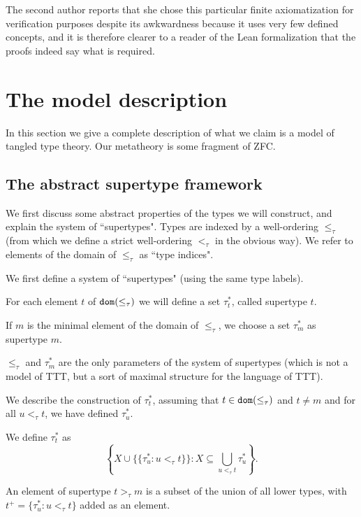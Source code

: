 \documentclass[112pt]{article}
\theoremstyle{definition}
\theoremstyle{remark}
\begin{document}
The second author reports that she chose this particular finite axiomatization for verification purposes despite its awkwardness because it uses very few defined concepts, and it is therefore clearer to a reader of the Lean formalization that the proofs indeed say what is required.



\newpage

\section{The model description}\label{s:model_description}


In this section we give a complete description of what we claim is a model of tangled type theory.  Our metatheory is some fragment of ZFC.

\subsection{The abstract supertype framework}
\label{ss:supertype_framework}


{We first discuss some abstract properties of the types we will construct, and explain the system of ``supertypes".}
Types are indexed by a well-ordering $\leq_\tau$ (from which we define a strict well-ordering $<_\tau$ in the obvious way).
We refer to elements of the domain of $\leq_\tau$ as ``type indices".

We first define a system of ``supertypes" (using the same type labels).

For each element $t$ of ${\tt dom}(\leq_\tau)$ we will define a set $\tau^*_t$, called supertype $t$.

If $m$ is the minimal element of the domain of $\leq_\tau$, we choose a set $\tau^*_m$ as supertype $m$.

$\leq_\tau$ and $\tau^*_m$ are the only parameters of the system of supertypes (which is not a model of TTT, but a sort of maximal structure for the language of TTT).

We describe the construction of $\tau^*_t$, assuming that $t \in {\tt dom}(\leq_\tau)$ and $t \neq m$ and for all $u <_\tau t$, we have
defined $\tau^*_u$.

We define $\tau^*_t$ as $$\left\{X \cup \{\{\tau^*_u:u <_\tau t\}\}:X \subseteq \bigcup_{u <_\tau t}\tau^*_u\right\}.$$

An element of supertype $t>_\tau m$ is a subset of the union of all lower types, with $t^+ = \{\tau^*_u:u <_\tau t\}$ added as an element.
\end{document}
